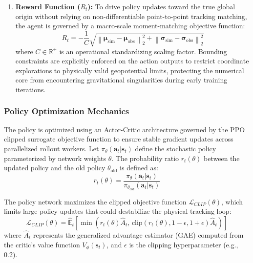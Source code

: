 \documentclass[letterpaper, preprint, 11pt]{AAS}
\begin{document}
\begin{enumerate}
    \item \textbf{Reward Function ($R_t$):} To drive policy updates toward the true global origin without relying on non-differentiable point-to-point tracking matching, the agent is governed by a macro-scale moment-matching objective function:
    \begin{equation}
        R_t = - \frac{1}{C} \sqrt{ \left\| \boldsymbol{\mu}_{\text{sim}} - \boldsymbol{\mu}_{\text{obs}} \right\|_2^2 + \left\| \boldsymbol{\sigma}_{\text{sim}} - \boldsymbol{\sigma}_{\text{obs}} \right\|_2^2 }
        \label{eq:ppo_reward}
    \end{equation}
    where $C \in \mathbb{R}^+$ is an operational standardizing scaling factor. Bounding constraints are explicitly enforced on the action outputs to restrict coordinate explorations to physically valid geopotential limits, protecting the numerical core from encountering gravitational singularities during early training iterations.
\end{enumerate}

\subsubsection{Policy Optimization Mechanics}
The policy is optimized using an Actor-Critic architecture governed by the PPO clipped surrogate objective function to ensure stable gradient updates across parallelized rollout workers. Let $\pi_\theta(\mathbf{a}_t | \mathbf{s}_t)$ define the stochastic policy parameterized by network weights $\theta$. The probability ratio $r_t(\theta)$ between the updated policy and the old policy $\theta_{\text{old}}$ is defined as:
\begin{equation}
    r_t(\theta) = \frac{\pi_\theta(\mathbf{a}_t | \mathbf{s}_t)}{\pi_{\theta_{\text{old}}}(\mathbf{a}_t | \mathbf{s}_t)}
    \label{eq:probability_ratio}
\end{equation}

The policy network maximizes the clipped objective function $\mathcal{L}_{CLIP}(\theta)$, which limits large policy updates that could destabilize the physical tracking loop:
\begin{equation}
    \mathcal{L}_{CLIP}(\theta) = \hat{\mathbb{E}}_t \left[ \min\left( r_t(\theta)\hat{A}_t, \, \text{clip}\left(r_t(\theta), 1-\epsilon, 1+\epsilon\right)\hat{A}_t \right) \right]
    \label{eq:ppo_clip_objective}
\end{equation}
where $\hat{A}_t$ represents the generalized advantage estimator (GAE) computed from the critic's value function $V_\phi(\mathbf{s}_t)$, and $\epsilon$ is the clipping hyperparameter (e.g., 0.2). 
\end{document}

